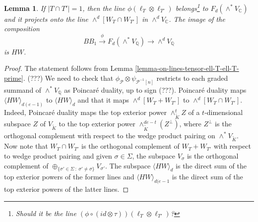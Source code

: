 \documentclass[12pt]{amsart}
\numberwithin{equation}{subsection}
\theoremstyle{plain}
\newtheorem{lem}[thm]{Lemma}
\theoremstyle{definition}
\newcommand{\CC}{{\mathbb C}}
\newcommand{\QQ}{{\mathbb Q}}
\renewcommand{\P}{{\mathcal P}}
\newcommand{\RightArrowOf}[1]{\stackrel{#1}{\rightarrow}}
\begin{document}
{\begin{lem}
\label{lemma-on-the-phi-image-of-lines-tensor-ell-T-ell-T-prime}
If $|T\cap T'|=1$, then the line $\phi(\ell_T\otimes\ell_{T'})$ belongs\footnote{Should it be the line $(\phi\circ (id\otimes\tau))(\ell_T\otimes\ell_{T'})$?
}
 to $F_d(\wedge^*V_\CC)$ and it projects onto the line
$\wedge^d[W_T\cap W_{T'}]$ in $\wedge^dV_\CC$. The image of the composition 
\begin{equation}
\label{eq-composition-from-BB-1-to-wedge-d}
BB_1\RightArrowOf{\phi}F_d(\wedge^*V_\QQ)\rightarrow \wedge^dV_\QQ
\end{equation}
is $HW$.
\end{lem}


\begin{proof}
The statement follows from Lemma \ref{lemma-on-lines-tensor-ell-T-ell-T-prime}.
(???) We need to check that $\phi_\P\otimes\psi_{\P^{-1}[n]}$ restricts to each graded summand of $\wedge^*V_\QQ$ 
as Poincar\'{e} duality, up to sign (???). Poincar\'{e} duality maps $\langle HW\rangle_{d(e-1)}$ to $\langle HW\rangle_d$ and that it maps $\wedge^d[W_T+ W_{T'}]$ to $\wedge^d[W_T\cap W_{T'}]$. 
Indeed, Poincar\'{e} duality maps the top exterior power $\wedge^t_{\tilde{K}}Z$ of a $t$-dimensional subspace $Z$ of $V_{\tilde{K}}$ to the top exterior power 
$\wedge^{de-t}_{\tilde{K}}(Z^\perp)$, where $Z^\perp$ is the orthogonal complement with respect to the wedge product pairing on $\wedge^*V_{\tilde{K}}$.
Now note that 
$W_T\cap W_{T'}$ is the orthogonal complement of $W_T+ W_{T'}$ with respect to wedge product pairing and 
given $\sigma\in\Sigma$, the subspace $V_\sigma$ is the orthogonal complement of $\oplus_{\{\sigma'\in\Sigma \ : \ \sigma'\neq\sigma\}}V_{\sigma'}$.
The subspace $\langle HW\rangle_d$ is the direct sum of the top exterior powers of the former lines and 
$\langle HW\rangle_{d(e-1}$ is the direct sum of the top exterior powers of the latter lines.
\end{proof}


}
\end{document}
